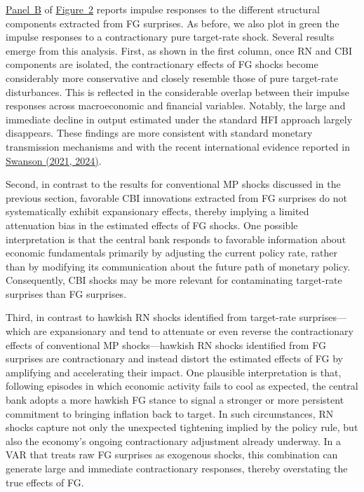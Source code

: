 \documentclass[12pt, reqno]{article}
\begin{document}
\hyperlink{Panel BF1}{Panel~B} of \hyperlink{Figure~2}{Figure~2} reports impulse responses to the different structural components extracted from FG surprises. As before, we also plot in green the impulse responses to a contractionary pure target-rate shock. Several results emerge from this analysis. First, as shown in the first column, once RN and CBI components are isolated, the contractionary effects of FG shocks become considerably more conservative and closely resemble those of pure target-rate disturbances. This is reflected in the considerable overlap between their impulse responses across macroeconomic and financial variables. Notably, the large and immediate decline in output estimated under the standard HFI approach largely disappears. These findings are more consistent with standard monetary transmission mechanisms and with the recent international evidence reported in \hyperlink{Swanson (2021, 2024)}{Swanson (2021, 2024)}.

Second, in contrast to the results for conventional MP shocks discussed in the previous section, favorable CBI innovations extracted from FG surprises do not systematically exhibit expansionary effects, thereby implying a limited attenuation bias in the estimated effects of FG shocks. One possible interpretation is that the central bank responds to favorable information about economic fundamentals primarily by adjusting the current policy rate, rather than by modifying its communication about the future path of monetary policy.  Consequently, CBI shocks may be more relevant for contaminating target-rate surprises than FG surprises. 

Third, in contrast to hawkish RN shocks identified from target-rate surprises—which are expansionary and tend to attenuate or even reverse the contractionary effects of conventional MP shocks—hawkish RN shocks identified from FG surprises are contractionary and instead distort the estimated effects of FG by amplifying and accelerating their impact. One plausible interpretation is that, following episodes in which economic activity fails to cool as expected, the central bank adopts a more hawkish FG stance to signal a stronger or more persistent commitment to bringing inflation back to target. In such circumstances, RN shocks capture not only the unexpected tightening implied by the policy rule, but also the economy’s ongoing contractionary adjustment already underway. In a VAR that treats raw FG surprises as exogenous shocks, this combination can generate large and immediate contractionary responses, thereby overstating the true effects of FG.
\end{document}
